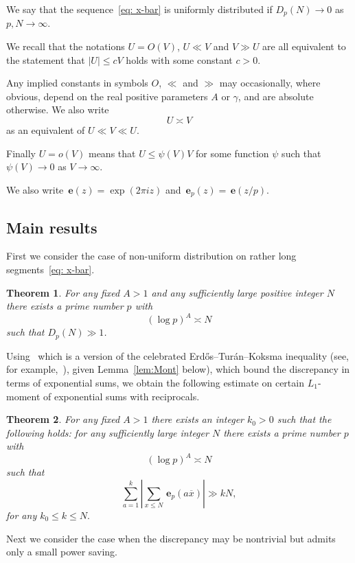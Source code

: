 \documentclass[12pt]{amsart}
\newtheorem{theorem}{Theorem}
\numberwithin{equation}{section}
\numberwithin{theorem}{section}
\numberwithin{table}{section}
\numberwithin{figure}{section}
\def\le{\leqslant}
\def\e{\mathbf{e}}
\def\xbar{\overline{x}}
\def\e{{\mathbf{\,e}}}
\def\ep{{\mathbf{\,e}}_p}
\begin{document}
We say that  the sequence~\eqref{eq: x-bar} is uniformly distributed if $D_p(N) \to 0$ as $p,N\to \infty$. 


We recall
that the notations $U = O(V)$,  $U \ll V$ and  $V \gg U$  are
all equivalent to the statement that $|U| \le c V$ holds
with some constant $c> 0$.

Any implied constants in symbols $O$, $\ll$
and $\gg$ may occasionally, where obvious, depend on the  real positive parameters $A$ or $\gamma$, 
 and are absolute otherwise. 
 We also write 
 $$U \asymp V
 $$ 
 as an equivalent of  $U\ll V \ll U$.   

Finally $U= o(V)$ means that $U \le \psi(V)V$ for some
function $\psi$ such that $\psi(V) \to 0$ as $V \to \infty$.

We also write $\e(z)=\exp(2\pi i z)$ and $\ep(z)=\e(z/p)$. 


 
\subsection{Main results}

First we consider the case of non-uniform distribution on rather long segments~\eqref{eq: x-bar}. 
\begin{theorem}
\label{thm: Non u.d.}  For  any fixed  $A > 1$ and any sufficiently large positive integer $N$ there exists a  prime number $p$ with
$$
(\log p)^A \asymp N 
$$
such that  $D_p(N) \gg 1$. 
\end{theorem}


Using~\cite[Chapter~1,
Theorem~1]{Mont} which is  a version of the celebrated Erd\H{o}s--Tur{\'a}n--Koksma inequality (see, for example,~\cite[Theorem~1.21]{DrTi}),   given  Lemma~\ref{lem:Mont} below), which bound the discrepancy in terms 
of exponential sums, we obtain the following  estimate on certain $L_1$-moment of exponential sums 
with reciprocals. 


 
\begin{theorem}
\label{thm: Exp Sum non saving}  For  any fixed  $A > 1$ there exists an integer $k_0>0$ such that the following holds: for any sufficiently large integer $N$ there exists a prime number $p$ with
$$
(\log p)^A \asymp N
$$
such that   
$$
\sum_{a=1}^k\left|\sum_{x\le N}\e_p(a\xbar)\right|\gg kN, 
$$ 
for any $k_0\le k\le N.$
\end{theorem}

Next we consider the case when the discrepancy may be nontrivial but admits only
a  small power saving. 
\end{document}
